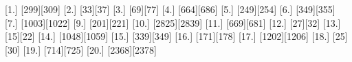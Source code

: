 [1.] [299][309]
[2.] [33][37]
[3.] [69][77]
[4.] [664][686]
[5.] [249][254]
[6.] [349][355]
[7.] [1003][1022]
[9.] [201][221]
[10.] [2825][2839]
[11.] [669][681]
[12.] [27][32]
[13.] [15][22]
[14.] [1048][1059]
[15.] [339][349]
[16.] [171][178]
[17.] [1202][1206]
[18.] [25][30]
[19.] [714][725]
[20.] [2368][2378]
